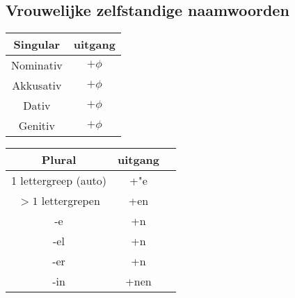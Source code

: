 \documentclass[main.tex]{subfiles}
\begin{document}
\subsection{Vrouwelijke zelfstandige naamwoorden}
\begin{minipage}[t]{0.5\textwidth}
\begin{tabular}{|c|c|}
\hline 
\rowcolor{gray}
Singular & uitgang \\ 
\hline 
\cellcolor[gray]{0.8}Nominativ & $+\phi$ \\ 
\hline 
\cellcolor[gray]{0.8}Akkusativ & $+\phi$ \\ 
\hline 
\cellcolor[gray]{0.8}Dativ & $+\phi$ \\ 
\hline 
\cellcolor[gray]{0.8}Genitiv & $+\phi$ \\ 
\hline 
\end{tabular}
\end{minipage}
\begin{minipage}[t]{0.5\textwidth}
\begin{tabular}{|c|c|c|}
\hline 
\rowcolor{gray}
Plural & uitgang \\ 
\hline 
\cellcolor[gray]{0.8}1 lettergreep (auto) & +"e \\ 
\hline 
\cellcolor[gray]{0.8} $>1$ lettergrepen & +en \\ 
\hline 
\cellcolor[gray]{0.8} -e & +n \\ 
\hline 
\cellcolor[gray]{0.8} -el & +n \\ 
\hline 
\cellcolor[gray]{0.8} -er & +n \\ 
\hline 
\cellcolor[gray]{0.8} -in & +nen \\ 
\hline 
\end{tabular} 
\end{minipage}
\end{document}
